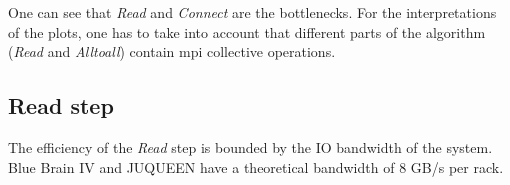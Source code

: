One can see that \emph{Read} and \emph{Connect} are the bottlenecks.
For the interpretations of the plots, one has to take into account that different parts of the algorithm
(\emph{Read} and \emph{Alltoall}) contain mpi collective operations.

\subsection{Read step}
\label{sec:speedup:load}
The efficiency of the \emph{Read} step is bounded by the IO bandwidth of the system.
Blue Brain IV and JUQUEEN have a theoretical bandwidth of $8$ GB/s per rack.

